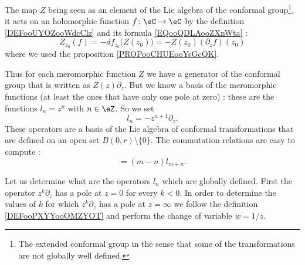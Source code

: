 \begin{normaltext}  \label{NORMooHDLPooQBfEif}
    The map \( Z\) being seen as an element of the Lie algebra of the conformal group\footnote{The extended conformal group in the sense that some of the transformations are not globally well defined.}, it acts on an holomorphic function \( f\colon \eC\to \eC \) by the definition \ref{DEFooUYOZooWdcClz} and its formula \eqref{EQooQDLAooZXnWta} :
    \begin{equation}
        Z_{z_0}(f)=-df_{z_0}\big( Z(z_0) \big)=-Z(z_0)(\partial_zf)(z_0)
    \end{equation}
    where we used the proposition \ref{PROPooCHUEooYsGcQK}.
\end{normaltext}

Thus for each meromorphic function \( Z\) we have a generator of the conformal group that is written as \( Z(z)\partial_z\). But we know a basis of the meromorphic functions (at least the ones that have only one pole at zero) : these are the functions \( l_n=z^n \) with \( n\in \eZ\). So we set
\begin{equation}
    l_n=-z^{n+1}\partial_z.
\end{equation}
These operators are a basis of the Lie algebra of conformal transformations that are defined on an open set \( B(0,r)\setminus \{ 0 \}\). The commutation relations are easy to compute :
\begin{equation}
    [l_m,l_n]=(m-n)l_{m+n}.
\end{equation}

Let us determine what are the operators \( l_n\) which are globally defined\cite{ooPEEYooCndpvc}. First the operator \( z^k\partial_z\) has a pole at \( z=0\) for every \( k<0\). In order to determine the values of \( k\) for which \( z^k\partial_z\) has a pole at \( z=\infty\) we follow the definition \ref{DEFooPXYYooOMZYOT} and perform the change of variable \(w=1/z\).

